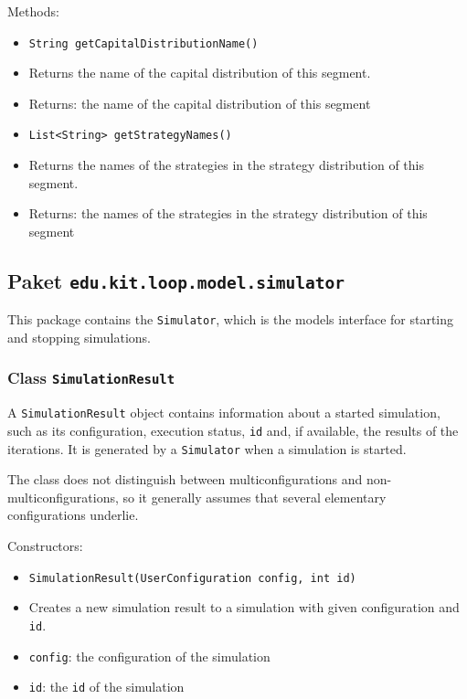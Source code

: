 \documentclass[parskip=full,11pt]{scrartcl}
\begin{document}
Methods:
\begin{itemize}\itemsep -10pt
\item \texttt{String getCapitalDistributionName()}
\item[] Returns the name of the capital distribution of this segment.
\item[] Returns: the name of the capital distribution of this segment

\item \texttt{List<String> getStrategyNames()}
\item[] Returns the names of the strategies in the strategy distribution of this segment.
\item[] Returns: the names of the strategies in the strategy distribution of this segment
\end{itemize}


\subsection{Paket \texttt{edu.kit.loop.model.simulator}}
This package contains the \texttt{Simulator}, which is the models interface for starting and stopping simulations.

\subsubsection{Class \texttt{SimulationResult}}
A \texttt{SimulationResult} object contains information about a started simulation, such as its configuration, execution status, \texttt{id} and, if available, the results of the iterations. It is generated by a \texttt{Simulator} when a simulation is started.

The class does not distinguish between multiconfigurations and non-multiconfigurations, so it generally assumes that several elementary configurations underlie.

Constructors:
\begin{itemize} \itemsep -10pt
	\item \texttt{SimulationResult(UserConfiguration config, int id)}
	\item[] Creates a new simulation result to a simulation with given configuration and \texttt{id}.
	\item[] \texttt{config}: the configuration of the simulation
	\item[] \texttt{id}: the \texttt{id} of the simulation
\end{itemize}
\end{document}
